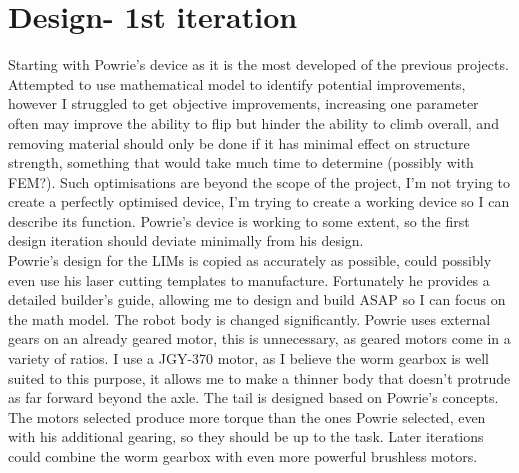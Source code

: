 \chapter{Design- 1st iteration}

Starting with Powrie's device as it is the most developed of the previous projects.\\
Attempted to use mathematical model to identify potential improvements, however I struggled to get objective improvements, increasing one parameter often may improve the ability to flip but hinder the ability to climb overall, and removing material should only be done if it has minimal effect on structure strength, something that would take much time to determine (possibly with FEM?). Such optimisations are beyond the scope of the project, I'm not trying to create a perfectly optimised device, I'm trying to create a working device so I can describe its function. Powrie’s device is working to some extent, so the first design iteration should deviate minimally from his design.\\
Powrie's design for the LIMs is copied as accurately as possible, could possibly even use his laser cutting templates to manufacture. Fortunately he provides a detailed builder's guide, allowing me to design and build ASAP so I can focus on the math model. The robot body is changed significantly. Powrie uses external gears on an already geared motor, this is unnecessary, as geared motors come in a variety of ratios. I use a JGY-370 motor, as I believe the worm gearbox is well suited to this purpose, it allows me to make a thinner body that doesn't protrude as far forward beyond the axle. The tail is designed based on Powrie’s concepts. The motors selected produce more torque than the ones Powrie selected, even with his additional gearing, so they should be up to the task. Later iterations could combine the worm gearbox with even more powerful brushless motors.